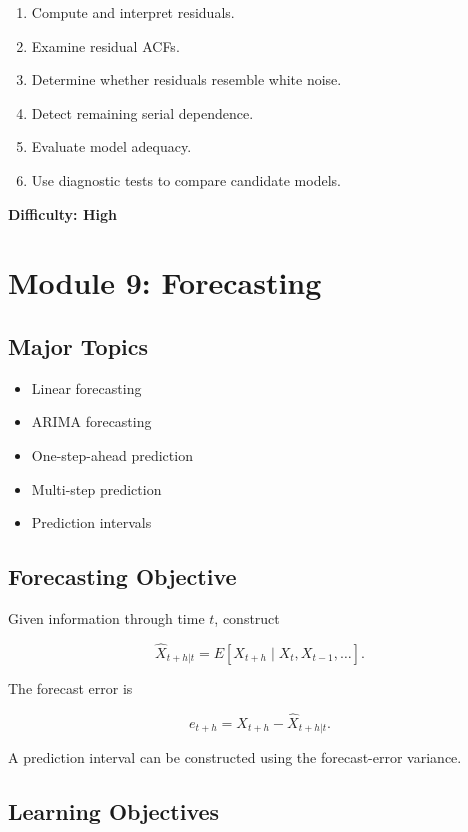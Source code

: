\documentclass[11pt]{article}
\begin{document}
\begin{enumerate}
    \item Compute and interpret residuals.
    \item Examine residual ACFs.
    \item Determine whether residuals resemble white noise.
    \item Detect remaining serial dependence.
    \item Evaluate model adequacy.
    \item Use diagnostic tests to compare candidate models.
\end{enumerate}

\textbf{Difficulty: High}

\section{Module 9: Forecasting}

\subsection{Major Topics}

\begin{itemize}
    \item Linear forecasting
    \item ARIMA forecasting
    \item One-step-ahead prediction
    \item Multi-step prediction
    \item Prediction intervals
\end{itemize}

\subsection{Forecasting Objective}

Given information through time $t$, construct

\[
\widehat{X}_{t+h|t}
=
E[X_{t+h}\mid X_t,X_{t-1},\ldots].
\]

The forecast error is

\[
e_{t+h}
=
X_{t+h}-\widehat{X}_{t+h|t}.
\]

A prediction interval can be constructed using the forecast-error
variance.

\subsection{Learning Objectives}
\end{document}
